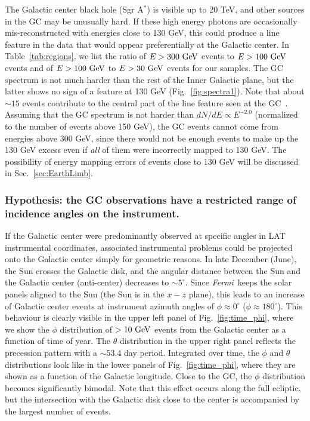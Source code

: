 \documentclass[aps,twocolumn,prd,superscriptaddress,showpacs,nofootinbib,fixfloat]{revtex4}
\newcommand{\Fermi}{{\slshape Fermi}}
\newcommand{\GeV}{{\rm ~GeV}}
\begin{document}
The Galactic center black hole (Sgr A$^*$) is visible up to 20 
TeV, and other
sources in the GC may be unusually hard. If these high energy
photons are occasionally mis-reconstructed with energies
close to 130 GeV, this could produce a line feature in the
data that would appear preferentially at the Galactic center.
In Table~\ref{tab:regions}, we list the ratio of $E>300\GeV$
events to $E>100\GeV$ events and of $E>100\GeV$ to $E>30\GeV$
events for our samples.  The
GC spectrum is not much harder than the rest of the Inner Galactic
plane, but the latter shows no sign of a feature at 130 GeV
(Fig.~\ref{fig:spectra1}). Note that
about $\sim15$ events contribute to the central part of the
line feature seen at the GC~\citep{linepaper}. 
Assuming that the GC spectrum is not
harder than $dN/dE \propto E^{-2.0}$ (normalized to the
number of events above 150 GeV), the GC events cannot come
from energies above 300 GeV, since there would not be enough
events to make up the 130 GeV excess even if \emph{all} of
them were incorrectly mapped to 130 GeV. The possibility of energy
mapping errors of events close to 130 GeV will be discussed
in Sec.~\ref{sec:EarthLimb}.

\subsubsection{Hypothesis: the GC observations have a
restricted range of incidence angles on the instrument.}

If the Galactic center were predominantly observed at
specific angles in LAT instrumental coordinates, associated
instrumental problems could be projected onto the Galactic
center simply for geometric reasons. 
In late December (June), the Sun crosses the Galactic disk,
and the angular
distance between the Sun and the Galactic center
(anti-center) decreases to $\sim5^\circ$. Since \Fermi\ keeps
the solar panels aligned to the Sun (the Sun is in the $x-z$ plane), this
leads to an
increase of Galactic center events at instrument azimuth
angles of $\phi\approx 0^\circ$ ($\phi\approx 180^\circ$).
This behaviour is clearly visible in the upper left panel of
Fig.~\ref{fig:time_phi}, where we show the $\phi$
distribution of $>10\GeV$ events from the Galactic center as
a function of time of year.  The $\theta$
distribution in the upper right panel reflects the
precession pattern with a $\sim53.4$ day period. Integrated
over time, the $\phi$ and $\theta$ distributions look like
in the lower panels of Fig.~\ref{fig:time_phi}, where they
are shown as a function of the Galactic longitude. Close to
the GC, the $\phi$ distribution becomes significantly
bimodal. Note that this effect occurs along the full 
ecliptic,
but the intersection with the Galactic disk
close to the center is accompanied by the largest number of
events.
\end{document}
